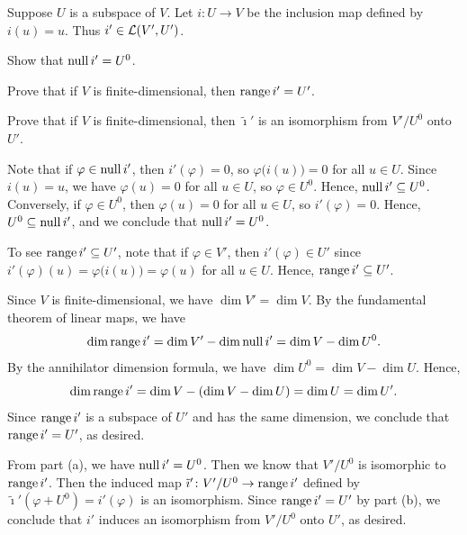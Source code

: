 \begin{exercise}
Suppose $U$ is a subspace of $V$. Let $i\colon U\to V$ be the inclusion map
defined by $i(u)=u$. Thus $i'\in\mathcal{L}(V',U')$.
\begin{parts}
\item Show that $\operatorname{null} i'=U^0$.
\item Prove that if $V$ is finite-dimensional, then $\operatorname{range} i'=U'$.
\item Prove that if $V$ is finite-dimensional, then $\tilde{\imath}'$ is an
  isomorphism from $V'/U^0$ onto $U'$.
\end{parts}
\end{exercise}
\begin{solution}\leavevmode
\begin{parts}
\item Note that if $\varphi\in\operatorname{null} i'$, then $i'(\varphi)=0$, so
  $\varphi\bigl(i(u)\bigr)=0$ for all $u\in U$. Since $i(u)=u$, we have
  $\varphi(u)=0$ for all $u\in U$, so $\varphi\in U^0$. Hence,
  $\operatorname{null} i'\subseteq U^0$. Conversely, if $\varphi\in U^0$, then $\varphi(u)=0$
  for all $u\in U$, so $i'(\varphi)=0$. Hence, $U^0\subseteq\operatorname{null} i'$, and we
  conclude that $\operatorname{null} i'=U^0$.
\item To see $\operatorname{range} i'\subseteq U'$, note that if $\varphi\in V'$, then
  $i'(\varphi)\in U'$ since $i'(\varphi)(u)=\varphi\bigl(i(u)\bigr)=\varphi(u)$
  for all $u\in U$. Hence, $\operatorname{range} i'\subseteq U'$.

  Since $V$ is finite-dimensional, we have $\dim V'=\dim V$. By the fundamental
  theorem of linear maps, we have
  \[ \operatorname{dim}\operatorname{range} i' = \operatorname{dim} V'-\operatorname{dim}\operatorname{null} i' = \operatorname{dim} V-\operatorname{dim} U^0. \]
  By the annihilator dimension formula, we have $\dim U^0=\dim V-\dim U$.
  Hence,
  \[ \operatorname{dim}\operatorname{range} i' = \operatorname{dim} V-(\operatorname{dim} V-\operatorname{dim} U) = \operatorname{dim} U = \operatorname{dim} U'. \]
  Since $\operatorname{range} i'$ is a subspace of $U'$ and has the same dimension, we
  conclude that $\operatorname{range} i'=U'$, as desired.
\item From part (a), we have $\operatorname{null} i'=U^0$. Then we know that $V'/U^0$ is
  isomorphic to $\operatorname{range} i'$. Then the induced map
  $\tilde{\imath}'\colon V'/U^0\to\operatorname{range} i'$ defined by
  $\tilde{\imath}'(\varphi+U^0)=i'(\varphi)$ is an isomorphism. Since
  $\operatorname{range} i'=U'$ by part (b), we conclude that $i'$ induces an isomorphism from
  $V'/U^0$ onto $U'$, as desired.
\end{parts}
\end{solution}

